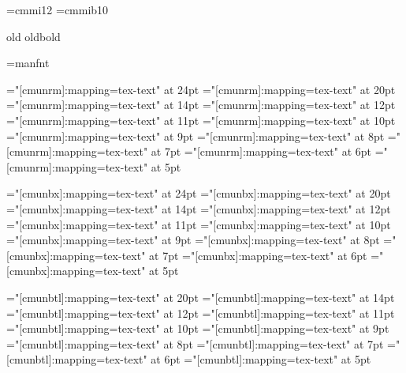 

%

\setfonts[/11pt]
\setfonts[CMRoman/]
\def\smallish{\setfonts[/mag.9]}
\def\smaller{\setfonts[/mag.8]}
\def\smallest{\setfonts[/mag.7]}
\def\larger{\setfonts[/mag1.2]}
\def\largest{\setfonts[/mag1.3]}
\font\twelvei=cmmi12
\font\tenmib=cmmib10
\def\xiioldrm{ \twelvei\relax}
\def\xoldbf{\tenmib\relax}

\DefStyle old     {\xiioldrm}
\DefStyle oldbold {\xoldbf}


\font\manual=manfnt

\def\scshape{%
\font\sc="[cmunrm]:+smcp:mapping=tex-text" at \fontdimen6\font
\sc%
}

\font\twentyfourrm="[cmunrm]:mapping=tex-text"  at 24pt
\font\twentyrm="[cmunrm]:mapping=tex-text"      at 20pt
\font\fourteenrm="[cmunrm]:mapping=tex-text"    at 14pt
\font\twelverm="[cmunrm]:mapping=tex-text"      at 12pt
\font\elevenrm="[cmunrm]:mapping=tex-text"      at 11pt
\font\tenrm="[cmunrm]:mapping=tex-text"         at 10pt
\font\ninerm="[cmunrm]:mapping=tex-text"        at 9pt
\font\eightrm="[cmunrm]:mapping=tex-text"       at 8pt
\font\sevenrm="[cmunrm]:mapping=tex-text"       at 7pt
\font\sixrm="[cmunrm]:mapping=tex-text"         at 6pt
\font\fiverm="[cmunrm]:mapping=tex-text"        at 5pt

\font\twentyfourbf="[cmunbx]:mapping=tex-text"  at 24pt
\font\twentybf="[cmunbx]:mapping=tex-text"      at 20pt
\font\fourteenbf="[cmunbx]:mapping=tex-text"    at 14pt
\font\twelvebf="[cmunbx]:mapping=tex-text"      at 12pt
\font\elevenbf="[cmunbx]:mapping=tex-text"      at 11pt
\font\tenbf="[cmunbx]:mapping=tex-text"         at 10pt
\font\ninebf="[cmunbx]:mapping=tex-text"        at 9pt
\font\eightbf="[cmunbx]:mapping=tex-text"       at 8pt
\font\sevenbf="[cmunbx]:mapping=tex-text"       at 7pt
\font\sixbf="[cmunbx]:mapping=tex-text"         at 6pt
\font\fivebf="[cmunbx]:mapping=tex-text"        at 5pt

\font\twentytt="[cmunbtl]:mapping=tex-text"     at 20pt
\font\fourteentt="[cmunbtl]:mapping=tex-text"   at 14pt
\font\twelvett="[cmunbtl]:mapping=tex-text"     at 12pt
\font\eleventt="[cmunbtl]:mapping=tex-text"     at 11pt
\font\tentt="[cmunbtl]:mapping=tex-text"        at 10pt
\font\ninett="[cmunbtl]:mapping=tex-text"       at 9pt
\font\eighttt="[cmunbtl]:mapping=tex-text"      at 8pt
\font\seventt="[cmunbtl]:mapping=tex-text"      at 7pt
\font\sixtt="[cmunbtl]:mapping=tex-text"        at 6pt
\font\fivett="[cmunbtl]:mapping=tex-text"       at 5pt

